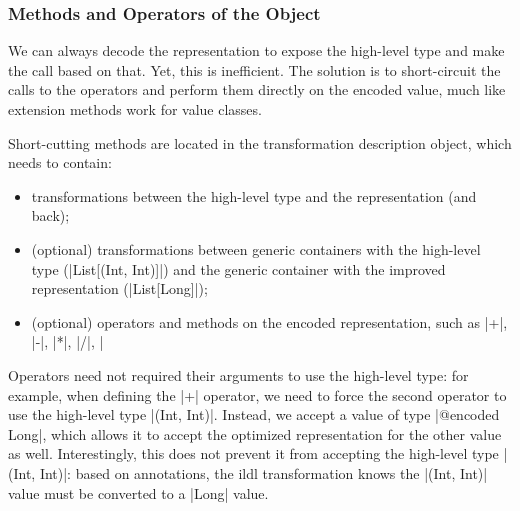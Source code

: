 \subsubsection{Methods and Operators of the Object}
We can always decode the representation to expose the high-level type and make the call based on that. Yet, this is inefficient. The solution is to short-circuit the calls to the operators and perform them directly on the encoded value, much like extension methods work for value classes.

Short-cutting methods are located in the transformation description object, which needs to contain:
\begin{itemize}
  \item transformations between the high-level type and the representation (and back);
  \item (optional) transformations between generic containers with the high-level type (|List[(Int, Int)]|) and the generic container with the improved representation (|List[Long]|);
  \item (optional) operators and methods on the encoded representation, such as |+|, |-|, |*|, |/|, |%
\end{itemize}

Operators need not required their arguments to use the high-level type: for example, when defining the |+| operator, we need to force the second operator to use the high-level type |(Int, Int)|. Instead, we accept a value of type |@encoded Long|, which allows it to accept the optimized representation for the other value as well. Interestingly, this does not prevent it from accepting the high-level type |(Int, Int)|: based on annotations, the ildl transformation knows the |(Int, Int)| value must be converted to a |Long| value.

